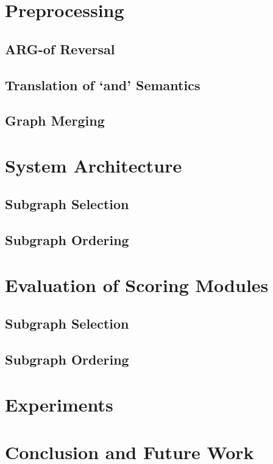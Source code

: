 \documentclass[12pt]{article}
\begin{document}
\section{Preprocessing}
\subsection{ARG-of Reversal}
\subsection{Translation of `and' Semantics}
\subsection{Graph Merging}

\section{System Architecture}
\subsection{Subgraph Selection}
\subsection{Subgraph Ordering}

\section{Evaluation of Scoring Modules}
\subsection{Subgraph Selection}
\subsection{Subgraph Ordering}

\section{Experiments}

\section{Conclusion and Future Work}

\pagebreak


\end{document}
